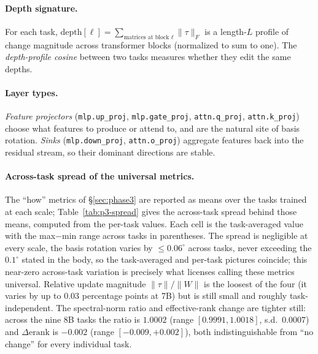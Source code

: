 \documentclass{article}
\newcommand{\tv}{\tau}
\newcommand{\dg}{^{\circ}}
\begin{document}
\paragraph{Depth signature.} For each task, $\mathrm{depth}[\ell]=\sum_{\text{matrices at block }\ell}
\|\tv\|_F$ is a length-$L$ profile of change magnitude across transformer blocks (normalized to sum
to one). The \emph{depth-profile cosine} between two tasks measures whether they edit the same
depths.

\paragraph{Layer types.} \emph{Feature projectors} (\texttt{mlp.up\_proj}, \texttt{mlp.gate\_proj},
\texttt{attn.q\_proj}, \texttt{attn.k\_proj}) choose what features to produce or attend to, and are
the natural site of basis rotation. \emph{Sinks} (\texttt{mlp.down\_proj}, \texttt{attn.o\_proj}) aggregate features back into the residual stream, so their dominant directions are stable.

\paragraph{Across-task spread of the universal metrics.} The ``how'' metrics of \S\ref{sec:phase3}
are reported as means over the tasks trained at each scale; Table~\ref{tab:p3-spread} gives the
across-task spread behind those means, computed from the per-task values. Each cell is the
task-averaged value with the max$-$min range across tasks in parentheses. The spread is negligible at
every scale, the basis rotation varies by $\leq0.06\dg$ across tasks, never exceeding the
$0.1\dg$ stated in the body, so the task-averaged and per-task pictures coincide; this near-zero
across-task variation is precisely what licenses calling these metrics universal. Relative update
magnitude $\|\tau\|/\|W\|$ is the loosest of the four (it varies by up to $0.03$ percentage points at
7B) but is still small and roughly task-independent. The spectral-norm ratio and effective-rank
change are tighter still: across the nine 8B tasks the ratio is $1.0002$ (range $[0.9991,1.0018]$,
s.d.\ $0.0007$) and $\Delta\mathrm{erank}$ is $-0.002$ (range $[-0.009,+0.002]$), both indistinguishable
from ``no change'' for every individual task.
\end{document}
